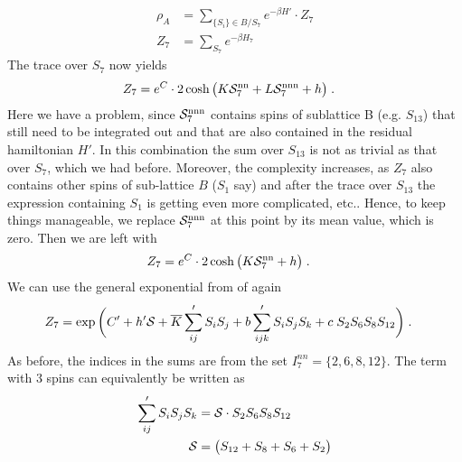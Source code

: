 %
\begin{align*}
\rho_{A} &= \sum_{\{S_{i}\}\in B / S_{7}} e^{-\beta H'}\cdot Z_{7}\\
Z_{7} &= \sum_{S_{7}} e^{-\beta H_{7}}
\end{align*}
% 
The trace over $S_{7}$ now yields
%
\begin{align}\label{eq:Z:7}
Z_{7}&= e^{C} \cdot 2\cosh\big(K {\cal S}^\text{nn}_{7}  + L {\cal S}^\text{nnn}_{7} + h  \big)\;.
\end{align}
%
Here we have a problem, since ${\cal S}^\text{nnn}_{7}$ contains spins of sublattice B (e.g. $S_{13}$)
that still need to be integrated out and that are also contained in the   
residual hamiltonian  $H'$. In this combination the sum over $S_{13}$ is not as trivial as
that over $S_{7}$, which we had before. Moreover, the complexity increases, as $Z_{7}$
also contains other spins of sub-lattice $B$ ($S_{1}$ say) and after the trace over $S_{13}$ the expression containing $S_{1}$ is getting even more complicated, etc..
Hence, to keep things manageable, we replace  ${\cal S}^\text{nnn}_{7}$ at this point by its mean value, which is zero.
Then we are left with
%
\begin{align}\label{eq:Z:7b}
Z_{7}&= e^{C} \cdot 2\cosh\big(K {\cal S}^\text{nn}_{7}  + h  \big)\;.
\end{align}
%
We can use the general exponential from of  again
%
\begin{align*}
Z_{7} &= \exp\bigg(C' + h' {\cal S}+ \overline K \sum'_{ij}  S_{i}S_{j}  +
b \sum'_{ijk} S_{i}S_{j} S_{k}  + c \; S_{2}S_{6}S_{8}S_{12}\bigg)\;.
\end{align*}
%
As before, the indices in the sums are from the set $I^{nn}_{7} =\{2,6,8,12\}$.
The term with 3 spins can equivalently be written as
%
\begin{align*}
\sum'_{ij} S_{i}S_{j}S_{k}   &= {\cal S} \cdot  S_{2}S_{6}S_{8}S_{12}  \\
\mathcal{S} &= \big( S_{12}+S_{8}+S_{6} +S_{2}\big)
\end{align*}
%

